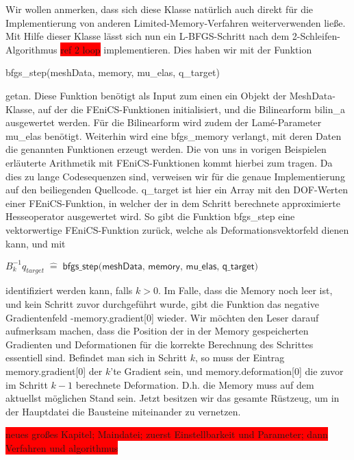 Wir wollen anmerken, dass sich diese Klasse natürlich auch direkt für die Implementierung von anderen Limited-Memory-Verfahren weiterverwenden ließe. 
Mit Hilfe dieser Klasse lässt sich nun ein L-BFGS-Schritt nach dem 2-Schleifen-Algorithmus \colorbox{red}{ref 2 loop} implementieren. Dies haben wir mit der Funktion 
\begin{center}
\textsf{bfgs\_step(meshData, memory, mu\_elas, q\_target)}
\end{center} getan. Diese Funktion benötigt als Input zum einen ein Objekt der  \textsf{MeshData}-Klasse, auf der die FEniCS-Funktionen initialisiert, und die Bilinearform \textsf{bilin\_a} ausgewertet werden. Für die Bilinearform wird zudem der Lamé-Parameter \textsf{mu\_elas} benötigt. Weiterhin wird eine \textsf{bfgs\_memory} verlangt, mit deren Daten die genannten Funktionen erzeugt werden. Die von uns in vorigen Beispielen erläuterte Arithmetik mit FEniCS-Funktionen kommt hierbei zum tragen. Da dies zu lange Codesequenzen sind, verweisen wir für die genaue Implementierung auf den beiliegenden Quellcode. \textsf{q\_target} ist hier ein Array mit den DOF-Werten einer FEniCS-Funktion, in welcher der in dem Schritt berechnete approximierte Hesseoperator ausgewertet wird. So gibt die Funktion \textsf{bfgs\_step} eine vektorwertige FEniCS-Funktion zurück, welche als Deformationsvektorfeld dienen kann, und mit
\begin{center}
	$B_k^{-1} q_{target} \; \hat{=} \; \textsf{bfgs\_step(meshData, memory, mu\_elas, q\_target)}$
\end{center}
identifiziert werden kann, falls $k>0$. Im Falle, dass die Memory noch leer ist, und kein Schritt zuvor durchgeführt wurde, gibt die Funktion das negative Gradientenfeld \textsf{-memory.gradient[0]} wieder. Wir möchten den Leser darauf aufmerksam machen, dass die Position der in der Memory gespeicherten Gradienten und Deformationen für die korrekte Berechnung des Schrittes essentiell sind. Befindet man sich in Schritt $k$, so muss der Eintrag \textsf{memory.gradient[0]} der $k$'te Gradient sein, und \textsf{memory.deformation[0]} die zuvor im Schritt $k-1$ berechnete Deformation. D.h. die Memory muss auf dem aktuellst möglichen Stand sein. Jetzt besitzen wir das gesamte Rüstzeug, um in der Hauptdatei die Bausteine miteinander zu vernetzen.

\colorbox{red}{neues großes Kapitel; Maindatei; zuerst Einstellbarkeit und Parameter; dann Verfahren und algorithmus}

